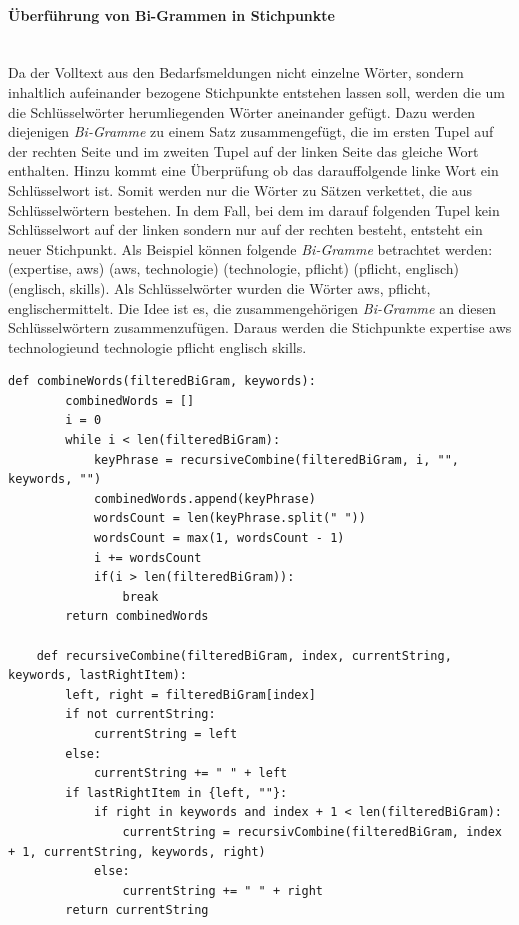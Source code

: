 \paragraph{Überführung von Bi-Grammen in Stichpunkte}\label{par:stichpunkte}\mbox{}\\
Da der Volltext aus den Bedarfsmeldungen nicht einzelne Wörter, sondern inhaltlich aufeinander bezogene Stichpunkte entstehen lassen soll, werden die um die Schlüsselwörter herumliegenden Wörter aneinander gefügt. Dazu werden diejenigen \emph{Bi-Gramme} zu einem Satz zusammengefügt, die im ersten Tupel auf der rechten Seite und im zweiten Tupel auf der linken Seite das gleiche Wort enthalten. Hinzu kommt eine Überprüfung ob das darauffolgende linke Wort ein Schlüsselwort ist. Somit werden nur die Wörter zu Sätzen verkettet, die aus Schlüsselwörtern bestehen. In dem Fall, bei dem im darauf folgenden Tupel kein Schlüsselwort auf der linken sondern nur auf der rechten besteht, entsteht ein neuer Stichpunkt. Als Beispiel können folgende \emph{Bi-Gramme} betrachtet werden: (\grqq expertise\grqq, \grqq aws\grqq) (\grqq aws\grqq, \grqq technologie\grqq) (\grqq technologie\grqq, \grqq pflicht\grqq) (\grqq pflicht\grqq, \grqq englisch\grqq) (\grqq englisch\grqq, \grqq skills\grqq). Als Schlüsselwörter wurden die Wörter \grqq aws\grqq, \grqq pflicht\grqq, \grqq englisch\grqq ermittelt. Die Idee ist es, die zusammengehörigen \emph{Bi-Gramme} an diesen Schlüsselwörtern zusammenzufügen. Daraus werden die Stichpunkte \grqq expertise aws technologie\grqq und \grqq technologie pflicht englisch skills\grqq.
\begin{lstlisting}[caption={Umformung der Bi-Gramm Liste in Stichpunkte}, label=lst:stichpunkte]
	def combineWords(filteredBiGram, keywords):
		combinedWords = []
		i = 0
		while i < len(filteredBiGram):
			keyPhrase = recursiveCombine(filteredBiGram, i, "", keywords, "")
			combinedWords.append(keyPhrase)
			wordsCount = len(keyPhrase.split(" "))
			wordsCount = max(1, wordsCount - 1)
			i += wordsCount
			if(i > len(filteredBiGram)):
				break
		return combinedWords
	
	def recursiveCombine(filteredBiGram, index, currentString, keywords, lastRightItem):
		left, right = filteredBiGram[index]
		if not currentString:
			currentString = left
		else:
			currentString += " " + left
		if lastRightItem in {left, ""}:
			if right in keywords and index + 1 < len(filteredBiGram):
				currentString = recursivCombine(filteredBiGram, index + 1, currentString, keywords, right)
			else:
				currentString += " " + right
		return currentString
\end{lstlisting}
